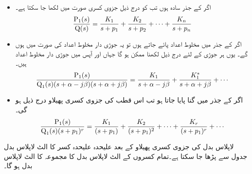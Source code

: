 \begin{itemize}
\item
اگر  کے جذر سادہ ہوں تب  کو درج ذیل جزوی کسری صورت میں لکھا جا سکتا ہے۔
\begin{align}
\frac{{{\textup{P}}}_1(s)}{{{\textup{Q}}}(s)}=\frac{K_1}{s+p_1}+\frac{K_2}{s+p_2}+\cdots+\frac{K_n}{s+p_n}
\end{align}
\item
اگر  کے جذر میں مخلوط اعداد پائے جاتے ہوں تو یہ جوڑی دار مخلوط اعداد کی صورت میں ہوں گے۔ یوں ہر جوڑی کے لئے درج ذیل لکھنا ممکن ہو گا جہاں  اور  آپس میں جوڑی دار مخلوط اعداد ہیں۔
\begin{align}
\frac{{{\textup{P}}}_1(s)}{{{\textup{Q}}}_1(s) (s+\alpha-j\beta)(s+\alpha+j\beta)}=\frac{K_1}{s+\alpha-j\beta}+\frac{K^*_1}{s+\alpha+j\beta}+\cdots
\end{align}
\item
اگر  کے جذر میں   گنا پایا جاتا ہو تب اس قطب کی جزوی کسری پھیلاو درج ذیل ہو گی۔
  \begin{align}
\frac{{{\textup{P}}}_1(s)}{{{\textup{Q}}}_1(s) (s+p_1)^r}=\frac{K_{1}}{(s+p_1)}+\frac{K_{2}}{(s+p_1)^2}+\cdots +\frac{K_{r}}{(s+p_1)^r}+\cdots
\end{align}
\end{itemize}

لاپلاس بدل  کی جزوی کسری پھیلاو کے بعد علیحدہ علیحدہ کسر کا الٹ لاپلاس بدل جدول سے پڑھا جا سکتا ہے۔تمام کسروں کے الٹ لاپلاس بدل کا مجموعہ  کا الٹ لاپلاس بدل ہو گا۔

